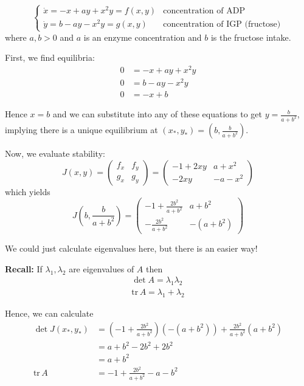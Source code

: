 \documentclass[12pt]{report}
\newcommand{\tr}{\text{tr}\,}
\newcommand*{\tbf}[1]{\ifmmode\mathbf{#1}\else\textbf{#1}\fi}
\begin{document}
\[\begin{cases}
        \dot x = -x + ay + x^2y = f(x, y) & \text{concentration of ADP}            \\
        \dot y = b - ay - x^2y = g(x, y)  & \text{concentration of IGP (fructose)}
    \end{cases}\]
where $a, b > 0$ and $a$ is an enzyme concentration and $b$ is the fructose intake.

First, we find equilibria:
\[\begin{array}{rl}
        0 & = -x + ay + x^2y \\
        0 & = b - ay - x^2y  \\
        \hline
        0 & = -x + b
    \end{array}\]


Hence $x = b$ and we can substitute into any of these equations to get $y = \frac{b}{a + b^2}$, implying there is a unique equilibrium at $(x_*, y_*) = (b, \frac{b}{a + b^2})$.

Now, we evaluate stability:
\[J(x, y) = \begin{pmatrix}
        f_x & f_y \\
        g_x & g_y
    \end{pmatrix} = \begin{pmatrix}
        -1 + 2xy & a + x^2  \\
        -2xy     & -a - x^2
    \end{pmatrix}\]
which yields
\[J\left(b, \frac{b}{a + b^2}\right) = \begin{pmatrix}
        -1 + \frac{2b^2}{a + b^2} & a + b^2    \\
        -\frac{2b^2}{a + b^2}     & -(a + b^2)
    \end{pmatrix} \]

We could just calculate eigenvalues here, but there is an easier way!

\tbf{Recall:} If $\lambda_1, \lambda_2$ are eigenvalues of $A$ then
\begin{align*}
    \det A = \lambda_1 \lambda_2 \\
    \tr A = \lambda_1 + \lambda_2
\end{align*}

Hence, we can calculate
\begin{align*}
    \det J(x_*, y_*) & = \left(-1 + \frac{2b^2}{a + b^2}\right)\left(-(a + b^2)\right) + \frac{2b^2}{a + b^2}\left(a + b^2\right) \\
                     & = a + b^2 - 2b^2 + 2b^2                                                                                    \\
                     & = a + b^2                                                                                                  \\
    \tr A            & = -1 + \frac{2b^2}{a + b^2} -a - b^2
\end{align*}
\end{document}
